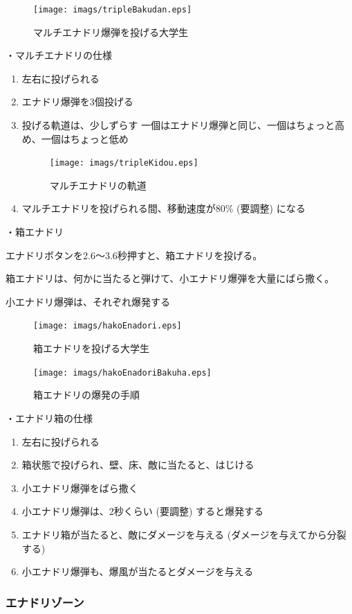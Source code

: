 \documentclass[12pt]{jsarticle}
\begin{document}
\begin{figure}[htbp]
  \begin{center}
    \texttt{[image: imags/tripleBakudan.eps]}
  \end{center}
  \caption{マルチエナドリ爆弾を投げる大学生}
\end{figure}

\newpage

・マルチエナドリの仕様
\begin{enumerate}
  \item 左右に投げられる
  \item エナドリ爆弾を3個投げる
  \item 投げる軌道は、少しずらす
  一個はエナドリ爆弾と同じ、一個はちょっと高め、一個はちょっと低め
  \begin{figure}[htbp]
    \begin{center}
      \texttt{[image: imags/tripleKidou.eps]}
    \end{center}
    \caption{マルチエナドリの軌道}
  \end{figure}
  \item マルチエナドリを投げられる間、移動速度が80\% (要調整) になる
\end{enumerate}

\newpage

・箱エナドリ

エナドリボタンを2.6〜3.6秒押すと、箱エナドリを投げる。

箱エナドリは、何かに当たると弾けて、小エナドリ爆弾を大量にばら撒く。

小エナドリ爆弾は、それぞれ爆発する

\begin{figure}[htbp]
  \begin{center}
    \texttt{[image: imags/hakoEnadori.eps]}
  \end{center}
  \caption{箱エナドリを投げる大学生}
\end{figure}

\begin{figure}[htbp]
  \begin{center}
    \texttt{[image: imags/hakoEnadoriBakuha.eps]}
  \end{center}
  \caption{箱エナドリの爆発の手順}
\end{figure}

\newpage

・エナドリ箱の仕様

\begin{enumerate}
  \item 左右に投げられる
  \item 箱状態で投げられ、壁、床、敵に当たると、はじける
  \item 小エナドリ爆弾をばら撒く
  \item 小エナドリ爆弾は、2秒くらい (要調整) すると爆発する
  \item エナドリ箱が当たると、敵にダメージを与える
  (ダメージを与えてから分裂する)
  \item 小エナドリ爆弾も、爆風が当たるとダメージを与える
\end{enumerate}

\newpage

\subsubsection{エナドリゾーン}
\end{document}
